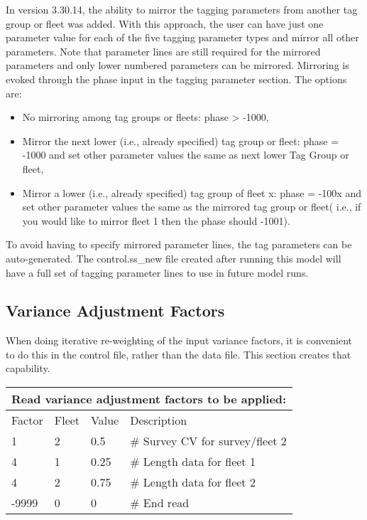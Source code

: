 In version 3.30.14, the ability to mirror the tagging parameters from another tag group or fleet was added. With this approach, the user can have just one parameter value for each of the five tagging parameter types and mirror all other parameters. Note that parameter lines are still required for the mirrored parameters and only lower numbered parameters can be mirrored. Mirroring is evoked through the phase input in the tagging parameter section.  The options are:
\begin{itemize}
	\item No mirroring among tag groups or fleets: phase > -1000,
	\item Mirror the next lower (i.e., already specified) tag group or fleet: phase = -1000 and set other parameter values the same as next lower Tag Group or fleet,
	\item Mirror a lower (i.e., already specified) tag group of fleet x: phase = -100x and set other parameter values the same as the mirrored tag group or fleet( i.e., if you would like to mirror fleet 1 then the phase should -1001).
\end{itemize}

To avoid having to specify mirrored parameter lines, the tag parameters can be auto-generated. The control.ss\_new file created after running this model will have a full set of tagging parameter lines to use in future model runs.

\hypertarget{GcompVar}{}
\subsection{Variance Adjustment Factors}
When doing iterative re-weighting of the input variance factors, it is convenient to do this in the control file, rather than the data file.  This section creates that capability.


\begin{longtable}{p{3cm} p{3cm} p{2.5cm} p{6.25cm} }

	\multicolumn{4}{l}{Read variance adjustment factors to be applied:}\\
	\hline
	Factor & Fleet & Value & Description \Tstrut\Bstrut\\
	\hline
	1 & 2 & 0.5 & \# Survey CV for survey/fleet 2 \Tstrut\\
	4 & 1 & 0.25 & \# Length data for fleet 1 \\
	4 & 2 & 0.75 & \# Length data for fleet 2\\
	-9999 & 0 & 0 & \# End read\Bstrut\\
	\hline
\end{longtable}


